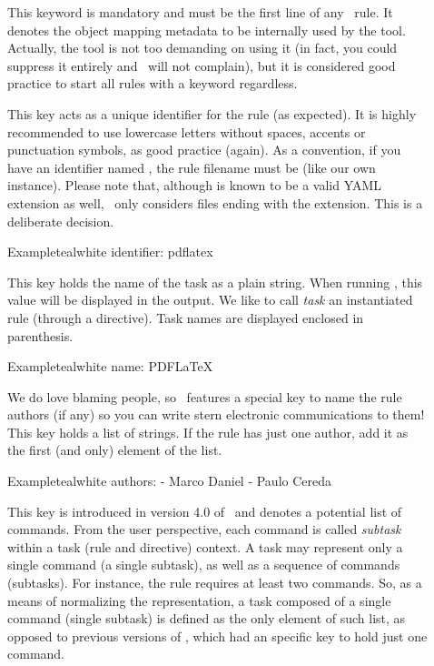 \begin{description}
\item[] This keyword is mandatory and must be the first line of any \arara\ rule. It denotes the object mapping metadata to be internally used by the tool. Actually, the tool is not too demanding on using it (in fact, you could suppress it entirely and \arara\ will not complain), but it is considered good practice to start all rules with a  keyword regardless.

\item[] This key acts as a unique identifier for the rule (as expected). It is highly recommended to use lowercase letters without spaces, accents or punctuation symbols, as good practice (again). As a convention, if you have an identifier named , the rule filename must be  (like our own instance). Please note that, although  is known to be a valid YAML extension as well, \arara\ only considers files ending with the  extension. This is a deliberate decision.

\begin{codebox}{Example}{teal}{\icnote}{white}
identifier: pdflatex
\end{codebox}

\item[] This key holds the name of the task as a plain string. When running \arara, this value will be displayed in the output. We like to call \emph{task} an instantiated rule (through a directive). Task names are displayed enclosed in parenthesis.

\begin{codebox}{Example}{teal}{\icnote}{white}
name: PDFLaTeX
\end{codebox}

\item[] We do love blaming people, so \arara\ features a special key to name the rule authors (if any) so you can write stern electronic communications to them! This key holds a list of strings. If the rule has just one author, add it as the first (and only) element of the list.

\begin{codebox}{Example}{teal}{\icnote}{white}
authors:
- Marco Daniel
- Paulo Cereda
\end{codebox}

\item[] This key is introduced in version 4.0 of \arara\ and denotes a potential list of commands. From the user perspective, each command is called \emph{subtask} within a task (rule and directive) context. A task may represent only a single command (a single subtask), as well as a sequence of commands (subtasks). For instance, the  rule requires at least two commands. So, as a means of normalizing the representation, a task composed of a single command (single subtask) is defined as the only element of such list, as opposed to previous versions of \arara, which had an specific key to hold just one command.


\end{description}
